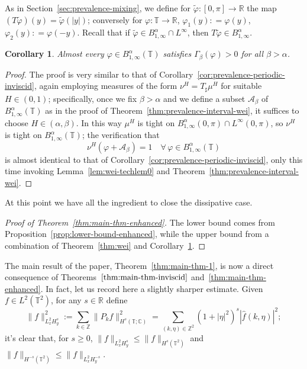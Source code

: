 \documentclass[11pt,oneside,reqno]{amsart}
\newcommand{\assign}{:=}
\newtheorem{corollary}[theorem]{Corollary}
\numberwithin{equation}{section}
\begin{document}
As in Section~\ref{sec:prevalence-mixing}, we define for $\tilde{\varphi} :
[0, \pi] \rightarrow \mathbb{R}$ the map $(T \tilde{\varphi}) (y) =
\tilde{\varphi} (| y |)$; conversely for $\varphi : \mathbb{T} \rightarrow
\mathbb{R}$, $\varphi_1 (y) : = \varphi (y)$, $\varphi_2 (y) : = \varphi (-
y)$. Recall that if $\tilde{\varphi} \in B^{\alpha}_{1, \infty} \cap
L^{\infty}$, then $T \tilde{\varphi} \in B^{\alpha}_{1, \infty}$.

\begin{corollary}
  \label{cor:prevalence-periodic-wei}Almost every $\varphi \in B^{\alpha}_{1,
  \infty} (\mathbb{T})$ satisfies $\Gamma_{\beta} (\varphi) > 0$ for all
  $\beta > \alpha$.
\end{corollary}

\begin{proof}
  The proof is very similar to that of
  Corollary~\ref{cor:prevalence-periodic-inviscid}, again employing measures
  of the form $\nu^H = T_{\sharp} \mu^H$ for suitable $H \in (0, 1)$;
  specifically, once we fix $\beta > \alpha$ and we define a subset
  $\mathcal{A}_{\beta}$ of $B^{\alpha}_{1, \infty} (\mathbb{T})$ as in the
  proof of Theorem~\ref{thm:prevalence-interval-wei}, it suffices to choose $H
  \in (\alpha, \beta)$. In this way $\mu^H$ is tight on $B^{\alpha}_{1,
  \infty} (0, \pi) \cap L^{\infty} (0, \pi)$, so $\nu^H$ is tight on
  $B^{\alpha}_{1, \infty} (\mathbb{T})$; the verification that
  \[ \nu^H (\varphi + \mathcal{A}_{\beta}) = 1 \quad \forall \, \varphi \in
     B^{\alpha}_{1, \infty} (\mathbb{T}) \]
  is almost identical to that of
  Corollary~\ref{cor:prevalence-periodic-inviscid}, only this time invoking
  Lemma~\ref{lem:wei-techlem0} and Theorem~\ref{thm:prevalence-interval-wei}.
\end{proof}

At this point we have all the ingredient to close the dissipative case.

\begin{proof}[Proof of Theorem~\ref{thm:main-thm-enhanced}]
  The lower bound comes from Proposition~\ref{prop:lower-bound-enhanced},
  while the upper bound from a combination of Theorem~\ref{thm:wei} and
  Corollary~\ref{cor:prevalence-periodic-wei}.
\end{proof}

The main result of the paper, Theorem~\ref{thm:main-thm-1}, is now a direct
consequence of Theorems~$\ref{thm:main-thm-inviscid}$
and~\ref{thm:main-thm-enhanced}.
In fact, let us record here a slightly sharper estimate. Given $f \in L^2
(\mathbb{T}^2)$, for any $s \in \mathbb{R}$ define
\[ \| f \|_{L^2_x H^s_y}^2 \assign \sum_{k \in \mathbb{Z}} \| P_k f \|_{H^s
   (\mathbb{T}; \mathbb{C})}^2 = \sum_{(k, \eta) \in \mathbb{Z}^2} (1 + | \eta
   |^2)^s  | \hat{f} (k, \eta) |^2 ; \]
it's clear that, for $s \geqslant 0$, $\| f \|_{L^2_x H^s_y} \leqslant \| f
\|_{H^s (\mathbb{T}^2)}$ and $\| f \|_{H^{- s} (\mathbb{T}^2)} \leqslant \| f
\|_{L^2_x H^{- s}_y}$.
\end{document}

